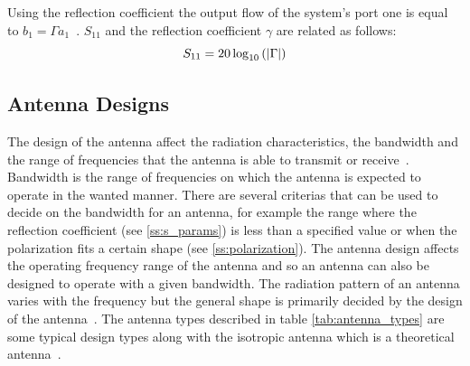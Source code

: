 Using the reflection coefficient the output flow of the system's port one is equal to $b_1=\Gamma a_1$~\cite{ming_notes}. $S_{11}$ and the reflection coefficient $\gamma$ are related as follows:
\begin{equation}
    S_{11} = 20 \log_{10}\left(\left|\Gamma\right|\right)
    \tagaddtext{[\si{\decibel}]}
\end{equation}

\subsection{Antenna Designs} \label{ss:antenna_design}
The design of the antenna affect the radiation characteristics, the bandwidth and the range of frequencies that the antenna is able to transmit or receive~\cite[p. 76]{direct_energy}. Bandwidth is the range of frequencies on which the antenna is expected to operate in the wanted manner. There are several criterias that can be used to decide on the bandwidth for an antenna, for example the range where the reflection coefficient (see \ref{ss:s_params}) is less than a specified value or when the polarization fits a certain shape (see \ref{ss:polarization}). The antenna design affects the operating frequency range of the antenna and so an antenna can also be designed to operate with a given bandwidth. The radiation pattern of an antenna varies with the frequency but the general shape is primarily decided by the design of the antenna~\cite{bandwidth}. The antenna types described in table \ref{tab:antenna_types} are some typical design types along with the isotropic antenna which is a theoretical antenna~\cite[p. 11]{ant_beam_form}.


